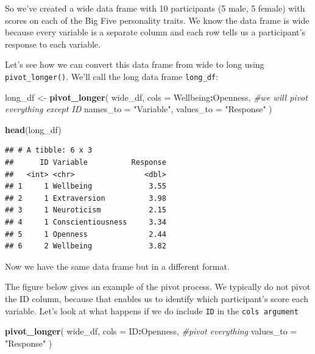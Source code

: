 \documentclass[
]{book}
\newenvironment{Shaded}{\begin{snugshade}}{\end{snugshade}}
\newcommand{\AttributeTok}[1]{\textcolor[rgb]{0.13,0.29,0.53}{#1}}
\newcommand{\CommentTok}[1]{\textcolor[rgb]{0.56,0.35,0.01}{\textit{#1}}}
\newcommand{\FunctionTok}[1]{\textcolor[rgb]{0.13,0.29,0.53}{\textbf{#1}}}
\newcommand{\NormalTok}[1]{#1}
\newcommand{\OtherTok}[1]{\textcolor[rgb]{0.56,0.35,0.01}{#1}}
\newcommand{\SpecialCharTok}[1]{\textcolor[rgb]{0.81,0.36,0.00}{\textbf{#1}}}
\newcommand{\StringTok}[1]{\textcolor[rgb]{0.31,0.60,0.02}{#1}}
\begin{document}
So we've created a wide data frame with 10 participants (5 male, 5 female) with scores on each of the Big Five personality traits. We know the data frame is wide because every variable is a separate column and each row tells us a participant's response to each variable.

Let's see how we can convert this data frame from wide to long using \texttt{pivot\_longer()}. We'll call the long data frame \texttt{long\_df}:

\begin{Shaded}
\begin{Highlighting}[]
\NormalTok{long\_df }\OtherTok{\textless{}{-}} \FunctionTok{pivot\_longer}\NormalTok{(}
\NormalTok{  wide\_df,}
  \AttributeTok{cols =}\NormalTok{ Wellbeing}\SpecialCharTok{:}\NormalTok{Openness, }\CommentTok{\#we will pivot everything except ID}
  \AttributeTok{names\_to =} \StringTok{"Variable"}\NormalTok{,}
  \AttributeTok{values\_to =} \StringTok{"Response"}
\NormalTok{)}

\FunctionTok{head}\NormalTok{(long\_df)}
\end{Highlighting}
\end{Shaded}

\begin{verbatim}
## # A tibble: 6 x 3
##      ID Variable          Response
##   <int> <chr>                <dbl>
## 1     1 Wellbeing             3.55
## 2     1 Extraversion          3.98
## 3     1 Neuroticism           2.15
## 4     1 Conscientiousness     3.34
## 5     1 Openness              2.44
## 6     2 Wellbeing             3.82
\end{verbatim}

Now we have the same data frame but in a different format.

The figure below gives an example of the pivot process. We typically do not pivot the ID column, because that enables us to identify which participant's score each variable. Let's look at what happens if we do include \texttt{ID} in the \texttt{cols\ argument}

\begin{Shaded}
\begin{Highlighting}[]
\FunctionTok{pivot\_longer}\NormalTok{(}
\NormalTok{  wide\_df,}
  \AttributeTok{cols =}\NormalTok{ ID}\SpecialCharTok{:}\NormalTok{Openness, }\CommentTok{\#pivot everything}
  \AttributeTok{values\_to =} \StringTok{"Response"}
\NormalTok{)}
\end{Highlighting}
\end{Shaded}
\end{document}
